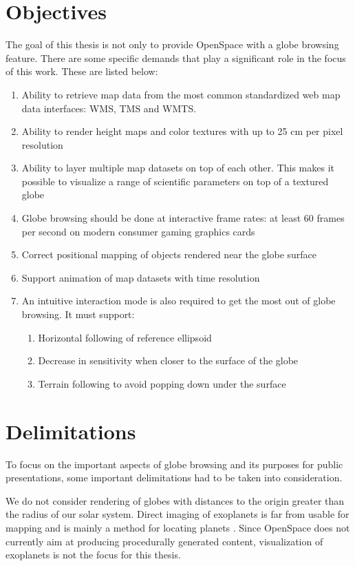 \section{Objectives}

The goal of this thesis is not only to provide OpenSpace with a globe browsing feature. There are some specific demands that play a significant role in the focus of this work. These are listed below:

\begin{enumerate}
    \item Ability to retrieve map data from the most common standardized web map data interfaces: WMS, TMS and WMTS.
    \item Ability to render height maps and color textures with up to 25 cm per pixel resolution
    \item Ability to layer multiple map datasets on top of each other. This makes it possible to visualize a range of scientific parameters on top of a textured globe
    \item Globe browsing should be done at interactive frame rates: at least 60 frames per second on modern consumer gaming graphics cards
    \item Correct positional mapping of objects rendered near the globe surface
    \item Support animation of map datasets with time resolution
    \item An intuitive interaction mode is also required to get the most out of globe browsing. It must support:
	\begin{enumerate}
    		\item Horizontal following of reference ellipsoid
		\item Decrease in sensitivity when closer to the surface of the globe
		\item Terrain following to avoid popping down under the surface
	\end{enumerate}
\end{enumerate}

\section{Delimitations}

To focus on the important aspects of globe browsing and its purposes for public presentations, some important delimitations had to be taken into consideration.

We do not consider rendering of globes with distances to the origin greater than the radius of our solar system. Direct imaging of exoplanets is far from usable for mapping and is mainly a method for locating planets \cite{exoplanets}. Since OpenSpace does not currently aim at producing procedurally generated content, visualization of exoplanets is not the focus for this thesis.

